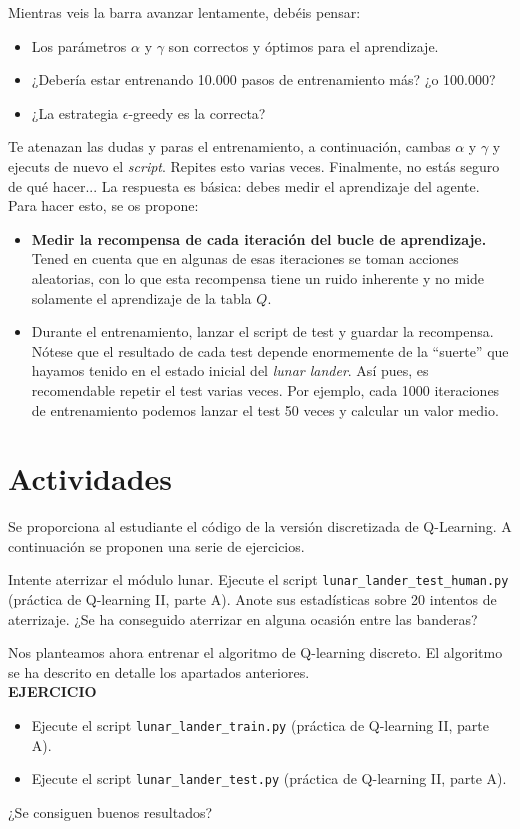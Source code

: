 \documentclass{article}
\begin{document}
Mientras veis la barra avanzar lentamente, debéis pensar:
\begin{itemize}
	\item Los parámetros $\alpha$ y $\gamma$ son correctos y óptimos para el aprendizaje.
	\item ¿Debería estar entrenando 10.000 pasos de entrenamiento más? ¿o 100.000?
	\item ¿La estrategia $\epsilon$-greedy es la correcta?
\end{itemize}
Te atenazan las dudas y paras el entrenamiento, a continuación, cambas $\alpha$ y $\gamma$ y ejecuts de nuevo el \textit{script}. Repites esto varias veces. Finalmente, no estás seguro de qué hacer... La respuesta es básica: debes medir el aprendizaje del agente. Para hacer esto, se os propone:
\begin{itemize}
	\item \textbf{Medir la recompensa de cada iteración del bucle de aprendizaje.} Tened en cuenta que en algunas de esas iteraciones se toman acciones aleatorias, con lo que esta recompensa tiene un ruido inherente y no mide solamente el aprendizaje de la tabla $Q$.
	\item Durante el entrenamiento, lanzar el script de test y guardar la recompensa. Nótese que el resultado de cada test depende enormemente de la ``suerte'' que hayamos tenido en el estado inicial del \textit{lunar lander}. Así pues, es recomendable repetir el test varias veces. Por ejemplo, cada 1000 iteraciones de entrenamiento podemos lanzar el test 50 veces y calcular un valor medio.	
\end{itemize}




\section{Actividades}
Se proporciona al estudiante el código de la versión discretizada de Q-Learning. A continuación se proponen una serie de ejercicios.


\begin{exercise}
    Intente aterrizar el módulo lunar. Ejecute el script \texttt{lunar\_lander\_test\_human.py} (práctica de  Q-learning II, parte A). Anote sus estadísticas sobre 20 intentos de aterrizaje. ¿Se ha conseguido aterrizar en alguna ocasión entre las banderas?
\end{exercise}


\begin{exercise}[breakable]
Nos planteamos ahora entrenar el algoritmo de Q-learning discreto. El algoritmo se ha descrito en detalle los apartados anteriores.
\\
\textbf{EJERCICIO}
\begin{itemize}
\item Ejecute el script \texttt{lunar\_lander\_train.py} (práctica de  Q-learning II, parte A). 
\item Ejecute el script \texttt{lunar\_lander\_test.py} (práctica de  Q-learning II, parte A). 
\end{itemize}

¿Se consiguen buenos resultados?

\end{exercise}
\end{document}
